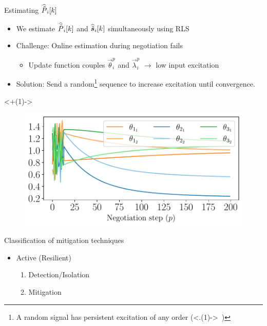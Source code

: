 \documentclass[aspectratio=169]{beamer}
\begin{document}
\begin{frame}{Estimating \small $\widehat{\tilde{P}}_{i}[k]$}
  \centering
  \begin{itemize}[<+(1)->]
    \item We estimate $\widehat{\tilde{P}}_{i}[k]$ and $\widehat{\tilde{\boldsymbol{s}}}_{i}[k]$ simultaneously using RLS
  \end{itemize}
  \vfill
  \begin{itemize}[<+(1)->]
    \item Challenge: Online estimation during negotiation fails
          \begin{itemize}
            \item Update function couples $\vec{\theta}_{i}^{p}$ and $\vec{\lambda}_{i}^{p}$ $\to$ low input excitation
          \end{itemize}
    \item Solution: Send a random\footnote{A random signal has persistent excitation of any order (\visible<.(1)->{\booksymbol~})} sequence to increase excitation until convergence.
  \end{itemize}

  \visible<+(1)->{
  \begin{minipage}{\textwidth}
    \centering
    \begin{figure}
      \includegraphics[width=.5\textwidth]{../img/resilient_eq/estimation_random_theta.pdf}
    \end{figure}
  \end{minipage}
  }
\end{frame}

\begin{frame}{Classification of mitigation techniques}
  \begin{itemize}
    \item Active (Resilient)
          \begin{enumerate}
            \item Detection/Isolation 
            \item Mitigation 
          \end{enumerate}
  \end{itemize}
\end{frame}
\end{document}
